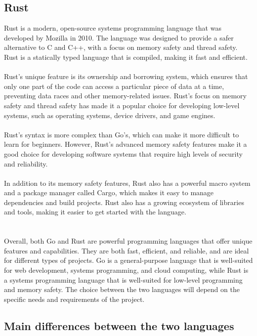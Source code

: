 \documentclass{dclass}
\begin{document}
\subsection{Rust}
Rust is a modern, open-source systems programming language that was developed by Mozilla in 2010. The language was designed to provide a safer alternative to C and C++, with a focus on memory safety and thread safety. Rust is a statically typed language that is compiled, making it fast and efficient.\cite{ref2}\\\\
Rust's unique feature is its ownership and borrowing system, which ensures that only one part of the code can access a particular piece of data at a time, preventing data races and other memory-related issues. Rust's focus on memory safety and thread safety has made it a popular choice for developing low-level systems, such as operating systems, device drivers, and game engines.\\\\
Rust's syntax is more complex than Go's, which can make it more difficult to learn for beginners. However, Rust's advanced memory safety features make it a good choice for developing software systems that require high levels of security and reliability.\\\\
In addition to its memory safety features, Rust also has a powerful macro system and a package manager called Cargo, which makes it easy to manage dependencies and build projects. Rust also has a growing ecosystem of libraries and tools, making it easier to get started with the language.\\\\\\
Overall, both Go and Rust are powerful programming languages that offer unique features and capabilities. They are both fast, efficient, and reliable, and are ideal for different types of projects. Go is a general-purpose language that is well-suited for web development, systems programming, and cloud computing, while Rust is a systems programming language that is well-suited for low-level programming and memory safety. The choice between the two languages will depend on the specific needs and requirements of the project.\\
\subsection{Main differences between the two languages}
\end{document}
